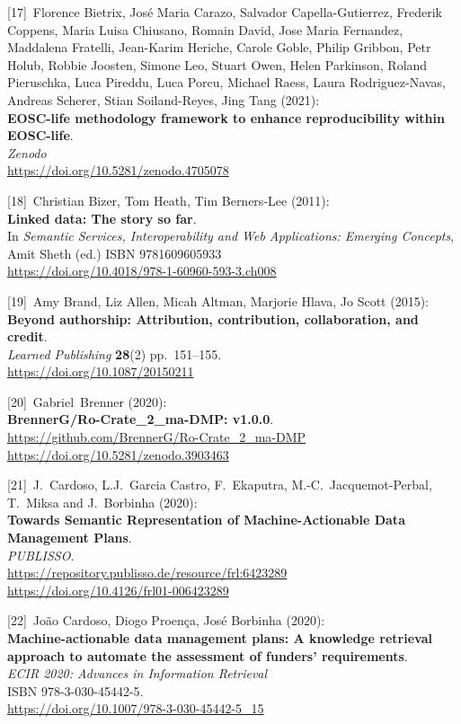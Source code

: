 {[}17{]}~Florence Bietrix, José Maria Carazo, Salvador
Capella-Gutierrez, Frederik Coppens, Maria Luisa Chiusano, Romain David,
Jose Maria Fernandez, Maddalena Fratelli, Jean-Karim Heriche, Carole
Goble, Philip Gribbon, Petr Holub, Robbie Joosten, Simone Leo, Stuart
Owen, Helen Parkinson, Roland Pieruschka, Luca Pireddu, Luca Porcu,
Michael Raess, Laura Rodriguez-Navas, Andreas Scherer, Stian
Soiland-Reyes, Jing Tang (2021):\\
\textbf{EOSC-life methodology framework to enhance reproducibility
within EOSC-life}.\\
\emph{Zenodo}\\
\url{https://doi.org/10.5281/zenodo.4705078}

{[}18{]}~Christian Bizer, Tom Heath, Tim Berners-Lee (2011):\\
\textbf{Linked data: The story so far}.\\
In \emph{Semantic Services, Interoperability and Web Applications:
Emerging Concepts}, Amit Sheth (ed.) ISBN 9781609605933\\
\url{https://doi.org/10.4018/978-1-60960-593-3.ch008}

{[}19{]}~Amy Brand, Liz Allen, Micah Altman, Marjorie Hlava, Jo Scott
(2015):\\
\textbf{Beyond authorship: Attribution, contribution, collaboration, and
credit}.\\
\emph{Learned Publishing} \textbf{28}(2) pp.~151--155.\\
\url{https://doi.org/10.1087/20150211}

{[}20{]}~Gabriel~Brenner (2020):\\
\textbf{BrennerG/Ro-Crate\_2\_ma-DMP: v1.0.0}.\\
\url{https://github.com/BrennerG/Ro-Crate_2_ma-DMP}~\\
\url{https://doi.org/10.5281/zenodo.3903463}

{[}21{]}~J.~Cardoso, L.J.~Garcia Castro, F.~Ekaputra,
M.-C.~Jacquemot-Perbal, T.~Miksa and J.~Borbinha (2020):\\
\textbf{Towards Semantic Representation of Machine-Actionable Data
Management Plans}.\\
\emph{PUBLISSO}.\\
\url{https://repository.publisso.de/resource/frl:6423289}~\\
\url{https://doi.org/10.4126/frl01-006423289}

{[}22{]}~João Cardoso, Diogo Proença, José Borbinha (2020):\\
\textbf{Machine-actionable data management plans: A knowledge retrieval
approach to automate the assessment of funders' requirements}.\\
\emph{ECIR 2020: Advances in Information Retrieval}\\
ISBN 978-3-030-45442-5.\\
\url{https://doi.org/10.1007/978-3-030-45442-5_15}

